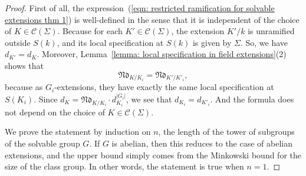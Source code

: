 \documentclass[12pt,a4paper]{amsart}
\numberwithin{equation}{section}%
\theoremstyle{plain}%
\theoremstyle{definition}%
\theoremstyle{remark}%
\begin{document}
	\begin{proof}
		First of all, the expression~(\ref{eqn: restricted ramification for solvable extensions thm 1}) is well-defined in the sense that it is independent of the choice of $K\in\mathcal{C}(\Sigma)$.
		Because for each $K'\in\mathcal{C}(\Sigma)$, the extension $K'/k$ is unramified outside $S(k)$, and its local specification at $S(k)$ is given by $\Sigma$.
		So, we have $d_{K'}=d_{K}$.
		Moreover, Lemma~\ref{lemma: local specification in field extensions}(2) shows that
		\begin{equation*}
			\mathfrak{Nd}_{K/K_i}=\mathfrak{Nd}_{K'/K'_i},
		\end{equation*}
		because as $G_i$-extensions, they have exactly the same local specification at $S(K_i)$.
		Since $d_{K}=\mathfrak{Nd}_{K/K_i}\cdot d_{K_i}^{\lvert G_i\rvert}$, we see that $d_{K_i}=d_{K'_i}$.
		And the formula does not depend on the choice of $K\in\mathcal{C}(\Sigma)$.
		
		We prove the statement by induction on $n$, the length of the tower of subgroups of the solvable group $G$.
		If $G$ is abelian, then this reduces to the case of abelian extensions, and the upper bound simply comes from the Minkowski bound for the size of the class group.
		In other words, the statement is true when $n=1$.
		

\end{proof}
\end{document}
